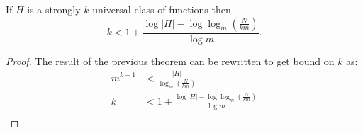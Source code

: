 \begin{corollary}
If $H$ is a strongly $k$-universal class of functions then
\begin{displaymath}
k < 1 + \frac{\log |H| - \log \log_m \left( \frac{N}{km} \right)}{\log m} \textit{.}
\end{displaymath}
\end{corollary}
\begin{proof}
The result of the previous theorem can be rewritten to get bound on $k$ as:
\begin{displaymath}
\begin{split}
m^{k - 1} & < \frac{|H|}{\log_m \left( \frac{N}{km} \right)} \\
k & < 1 + \frac{\log |H| - \log \log_m \left( \frac{N}{km} \right)}{\log m} \\
\end{split}
\end{displaymath}
\end{proof}

